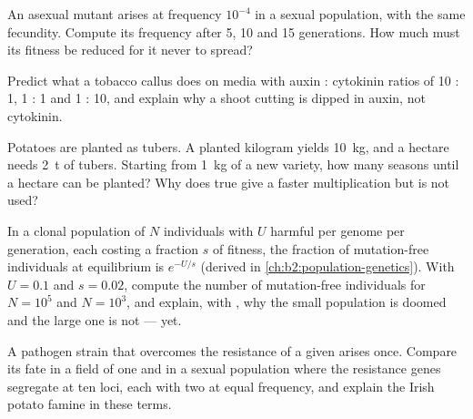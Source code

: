 \begin{exercise}[$\star\star$]\label{exo:b2:asexual-reproduction:7}
An asexual mutant arises at frequency $10^{-4}$ in a sexual
population, with the same fecundity. Compute its frequency after 5,
10 and 15 generations. How much must its fitness be reduced for it
never to spread?
\end{exercise}

\begin{exercise}[$\star\star$]\label{exo:b2:asexual-reproduction:8}
Predict what a tobacco callus does on media with auxin : cytokinin
ratios of 10 : 1, 1 : 1 and 1 : 10, and explain why a shoot cutting
is dipped in auxin, not cytokinin.
\end{exercise}

\begin{exercise}[$\star\star$]\label{exo:b2:asexual-reproduction:9}
Potatoes are planted as tubers. A planted kilogram yields
\qty{10}{kg}, and a hectare needs \qty{2}{t} of  tubers. Starting
from \qty{1}{kg} of a new variety, how many seasons until a hectare
can be planted? Why does true  give a faster multiplication but
is not used?
\end{exercise}

\begin{exercise}[$\star\star\star$]\label{exo:b2:asexual-reproduction:10}
In a clonal population of $N$ individuals with $U$ harmful 
per genome per generation, each costing a fraction $s$ of fitness,
the fraction of mutation-free individuals at equilibrium is
$e^{-U/s}$ (derived in \cref{ch:b2:population-genetics}). With $U =
0.1$ and $s = 0.02$, compute the number of mutation-free
individuals for $N = 10^{5}$ and $N = 10^{3}$, and explain, with
, why the small population is doomed and the large
one is not --- yet.
\end{exercise}

\begin{exercise}[$\star\star\star$]\label{exo:b2:asexual-reproduction:11}
A pathogen strain that overcomes the resistance of a given 
arises once. Compare its fate in a field of one  and in a
sexual population where the resistance genes segregate at ten loci,
each with two  at equal frequency, and explain the Irish
potato famine in these terms.
\end{exercise}


